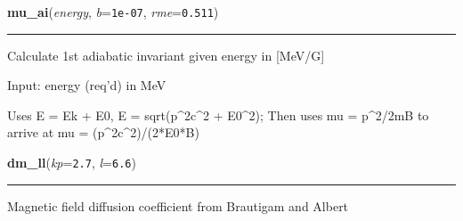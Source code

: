     \label{spacepy:utils:mu_ai}

    \vspace{0.5ex}

\hspace{.8\funcindent}\begin{boxedminipage}{\funcwidth}

    \raggedright \textbf{mu\_ai}(\textit{energy}, \textit{b}={\tt 1e-07}, \textit{rme}={\tt 0.511})

    \vspace{-1.5ex}

    \rule{\textwidth}{0.5\fboxrule}
\setlength{\parskip}{2ex}
    Calculate 1st adiabatic invariant given energy in [MeV/G]

    Input: energy (req'd) in MeV

    Uses E = Ek + E0, E = sqrt(p{\textasciicircum}2c{\textasciicircum}2 + 
    E0{\textasciicircum}2); Then uses mu = p{\textasciicircum}2/2mB to 
    arrive at mu = (p{\textasciicircum}2c{\textasciicircum}2)/(2*E0*B)

\setlength{\parskip}{1ex}
    \end{boxedminipage}

    \label{spacepy:utils:dm_ll}

    \vspace{0.5ex}

\hspace{.8\funcindent}\begin{boxedminipage}{\funcwidth}

    \raggedright \textbf{dm\_ll}(\textit{kp}={\tt 2.7}, \textit{l}={\tt 6.6})

    \vspace{-1.5ex}

    \rule{\textwidth}{0.5\fboxrule}
\setlength{\parskip}{2ex}
    Magnetic field diffusion coefficient from Brautigam and Albert

\setlength{\parskip}{1ex}
    \end{boxedminipage}

    \label{spacepy:utils:windowmean}

    \vspace{0.5ex}

